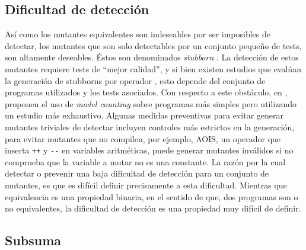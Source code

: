 \subsection{Dificultad de detecci\'on}

As\'i como los mutantes equivalentes son indeseables por ser imposibles de detectar, los mutantes que son solo detectables por un conjunto peque\~no de tests, son altamente deseables. \'Estos son denominados \emph{stubborn} \cite{bibliography.mutation.evaluation.stubbornHieronsHD99}. La detecci\'on de estos mutantes requiere tests de ``mejor calidad'', y si bien existen estudios que eval\'uan la generaci\'on de stubborns por operador \cite{bibliography.mutation.evaluation.stubborn}, esto depende del conjunto de programas utilizados y los tests asociados. Con respecto a este obst\'aculo, en \cite{bibliography.mutation.evaluation.hardnessVisser}, proponen el uso de \emph{model counting} sobre programas m\'as simples pero utilizando un estudio m\'as exhaustivo. Algunas medidas preventivas para evitar generar mutantes triviales de detectar incluyen controles m\'as estrictos en la generaci\'on, para evitar mutantes que no compilen, por ejemplo, AOIS, un operador que inserta \lstinline|++| y \lstinline|--| en variables aritm\'eticas, puede generar mutantes inv\'alidos si no comprueba que la variable a mutar no es una constante. La raz\'on por la cual detectar o prevenir una baja dificultad de detecci\'on para un conjunto de mutantes, es que es dif\'icil definir precisamente a esta dificultad. Mientras que equivalencia es una propiedad binaria, en el sentido de que, dos programas son o no equivalentes, la dificultad de detecci\'on es una propiedad muy dif\'icil de definir. 

\subsection{Subsuma}

